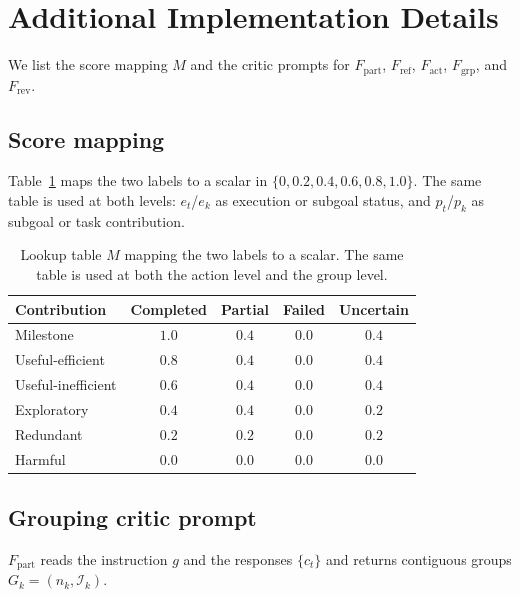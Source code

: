 \appendix

\section{Additional Implementation Details}
\label{app:impl}

We list the score mapping $M$ and the critic prompts for $F_{\mathrm{part}}$, $F_{\mathrm{ref}}$, $F_{\mathrm{act}}$, $F_{\mathrm{grp}}$, and $F_{\mathrm{rev}}$.

\subsection{Score mapping}
\label{app:score-map}

Table~\ref{tab:score-map} maps the two labels to a scalar in $\{0,0.2,0.4,0.6,0.8,1.0\}$.
The same table is used at both levels: $e_t$/$e_k$ as execution or subgoal status, and $p_t$/$p_k$ as subgoal or task contribution.

\begin{table}[h]
\caption{Lookup table $M$ mapping the two labels to a scalar. The same table is used at both the action level and the group level.}
\label{tab:score-map}
\centering
\small
\begin{tabular}{lcccc}
\toprule
Contribution & Completed & Partial & Failed & Uncertain \\
\midrule
Milestone & $1.0$ & $0.4$ & $0.0$ & $0.4$ \\
Useful-efficient & $0.8$ & $0.4$ & $0.0$ & $0.4$ \\
Useful-inefficient & $0.6$ & $0.4$ & $0.0$ & $0.4$ \\
Exploratory & $0.4$ & $0.4$ & $0.0$ & $0.2$ \\
Redundant & $0.2$ & $0.2$ & $0.0$ & $0.2$ \\
Harmful & $0.0$ & $0.0$ & $0.0$ & $0.0$ \\
\bottomrule
\end{tabular}
\end{table}

\subsection{Grouping critic prompt}
\label{app:prompt-part}
$F_{\mathrm{part}}$ reads the instruction $g$ and the responses $\{c_t\}$ and returns contiguous groups $G_k=(n_k,\mathcal{I}_k)$.

